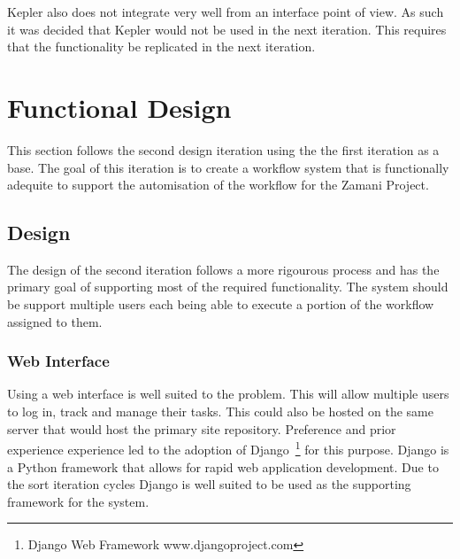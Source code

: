 \documentclass[12pt,a4paper]{report}
\begin{document}
Kepler also does not integrate very well from an interface point of view.
As such it was decided that Kepler would not be used in the next iteration. This
requires that the functionality be replicated in the next iteration.

\section{Functional Design\label{iteration2}}
This section follows the second design iteration using the the first iteration
as a base. The goal of this iteration is to create a workflow system that is
functionally adequite to support the automisation of the workflow for the Zamani
Project.

\subsection{Design}
The design of the second iteration follows a more rigourous process and has the
primary goal of supporting most of the required functionality. The system should
be support multiple users each being able to execute a portion of the workflow
assigned to them.
\subsubsection{Web Interface}
Using a web interface is well suited to the problem. This will allow multiple
users to log in, track and manage their tasks. This could also be hosted on the
same server that would host the primary site repository. Preference and prior
experience experience led to the adoption of Django~\footnote{Django Web Framework
www.djangoproject.com} for this purpose. Django is a Python framework that allows
for rapid web application development. Due to the sort iteration cycles Django is
well suited to be used as the supporting framework for the system.
\end{document}
